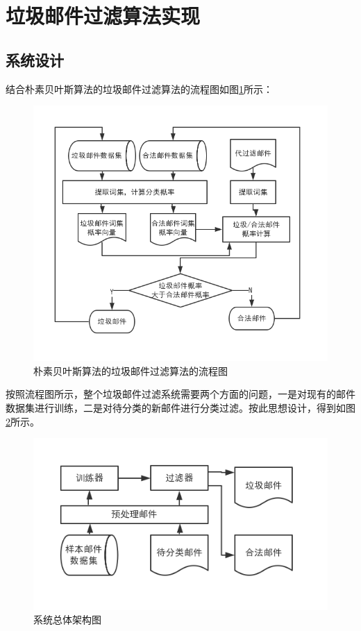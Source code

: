\documentclass[UTF8,zihao=-4]{ctexart}
\begin{document}
\section{垃圾邮件过滤算法实现}
\subsection{系统设计}
	结合朴素贝叶斯算法的垃圾邮件过滤算法的流程图如图\ref{fig:overall-flowchart}所示：
	
	\begin{figure}[ht]
		\centering
		\includegraphics[scale=0.5]{pictures/朴素贝叶斯算法的垃圾邮件过滤算法的流程图.png}
		\caption{朴素贝叶斯算法的垃圾邮件过滤算法的流程图}
		\label{fig:overall-flowchart}
	\end{figure}

	按照流程图所示，整个垃圾邮件过滤系统需要两个方面的问题，一是对现有的邮件数据集进行训练，二是对待分类的新邮件进行分类过滤。按此思想设计，得到如图\ref{fig:overall-structure}所示。
	
	\begin{figure}[ht]
		\centering
		\setlength{\abovecaptionskip}{0.cm}
		\setlength{\belowcaptionskip}{-0.cm}
		\includegraphics[scale=0.5]{pictures/系统总体架构图.png}
		\caption{系统总体架构图}
		\label{fig:overall-structure}
	\end{figure}
\end{document}

